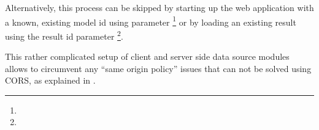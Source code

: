 Alternatively, this process can be skipped by starting up the web application with a known, existing model id using  parameter \footnote{\splurl[?mid=42]} or by loading an existing result using the result id  parameter \footnote{\splurl[?rid=1337]}.

This rather complicated setup of client and server side data source modules allows to circumvent any ``same origin policy'' issues that can not be solved using CORS, as explained in .



